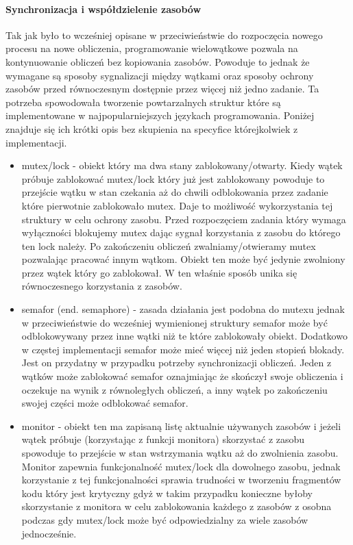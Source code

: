 \paragraph{Synchronizacja i współdzielenie zasobów}

Tak jak było to wcześniej opisane w przeciwieństwie do rozpoczęcia nowego procesu na nowe obliczenia, programowanie wielowątkowe pozwala na kontynuowanie obliczeń bez kopiowania zasobów. 
Powoduje to jednak że wymagane są sposoby sygnalizacji między wątkami oraz sposoby ochrony zasobów przed równoczesnym dostępnie przez więcej niż jedno zadanie. 
Ta potrzeba spowodowała tworzenie powtarzalnych struktur które są implementowane w najpopularniejszych językach programowania. 
Poniżej znajduje się ich krótki opis bez skupienia na specyfice którejkolwiek z implementacji. 
\begin{itemize}
        \item mutex/lock - obiekt który ma dwa stany zablokowany/otwarty.
        Kiedy wątek próbuje zablokować mutex/lock który już jest zablokowany powoduje to przejście wątku w stan czekania aż do chwili odblokowania przez zadanie które pierwotnie zablokowało mutex.
        Daje to możliwość wykorzystania tej struktury w celu ochrony zasobu. Przed rozpoczęciem zadania który wymaga wyłączności blokujemy mutex dając sygnał korzystania z zasobu do którego ten lock należy. 
        Po zakończeniu obliczeń zwalniamy/otwieramy mutex pozwalając pracować innym wątkom. Obiekt ten może być jedynie zwolniony przez wątek który go zablokował. 
        W ten właśnie sposób unika się równoczesnego korzystania z zasobów. 
        \item semafor (end. semaphore) - zasada działania jest podobna do mutexu jednak w przeciwieństwie do wcześniej wymienionej struktury semafor może być odblokowywany przez inne wątki niż te które zablokowały obiekt. Dodatkowo w częstej implementacji semafor może mieć więcej niż jeden stopień blokady. 
        Jest on przydatny w przypadku potrzeby synchronizacji obliczeń. Jeden z wątków może zablokować semafor oznajmiając że skończył swoje obliczenia i oczekuje na wynik z równoległych obliczeń, a inny wątek po zakończeniu swojej części może odblokować semafor. 
        \item monitor - obiekt ten ma zapisaną listę aktualnie używanych zasobów i jeżeli wątek próbuje (korzystając z funkcji monitora) skorzystać z zasobu spowoduje to przejście w stan wstrzymania wątku aż do zwolnienia zasobu. 
        Monitor zapewnia funkcjonalność mutex/lock dla dowolnego zasobu, jednak korzystanie z tej funkcjonalności sprawia trudności w tworzeniu fragmentów kodu który jest krytyczny gdyż w takim przypadku konieczne byłoby skorzystanie z monitora w celu zablokowania każdego z zasobów z osobna podczas gdy mutex/lock może być odpowiedzialny za wiele zasobów jednocześnie.   
\end{itemize} 


